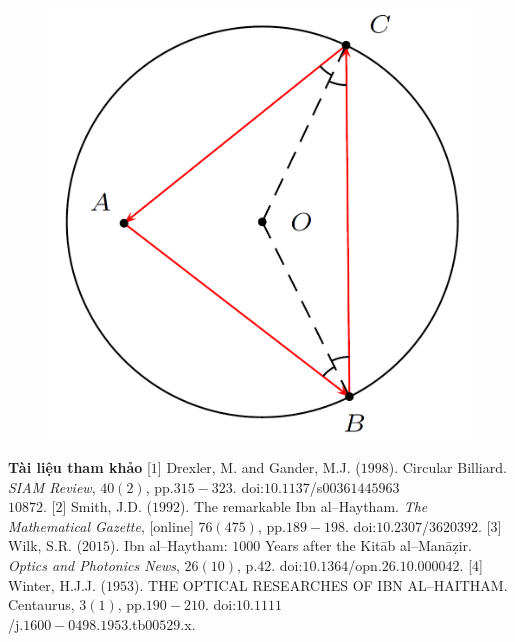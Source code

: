 \begin{multicols}{2}
	\begin{figure}[H]
		\vspace*{-5pt}
		\centering
		\captionsetup{labelformat= empty, justification=centering}
		\includegraphics[width= 0.75\linewidth]{18}
		\vspace*{-10pt}
	\end{figure}
	\vskip 0.1cm
	\textbf{\color{lichsutoanhoc}Tài liệu tham khảo}
	\vskip 0.1cm
	[$1$] Drexler, M. and Gander, M.J. ($1998$). Circular Billiard. \textit{SIAM Review}, $40(2)$, pp.$315-323$. doi:$10.1137$/s$00361445963$\\$10872$.
	\vskip 0.1cm
	[$2$] Smith, J.D. ($1992$). The remarkable Ibn al--Haytham. \textit{The Mathematical Gazette}, [online] $76(475)$, pp.$189-198$. doi:$10.2307$/$3620392$.
	\vskip 0.1cm
	[$3$] Wilk, S.R. ($2015$). Ibn al--Haytham: $1000$ Years after the Kitāb al--Manāẓir. \textit{Optics and Photonics News}, $26(10)$, p.$42$. doi:$10.1364$/opn.$26.10.000042$.
	\vskip 0.1cm
	[$4$] Winter, H.J.J. ($1953$). THE OPTICAL RESEARCHES OF IBN AL--HAITHAM. Centaurus, $3(1)$, pp.$190-210$. doi:$10.1111$\\/j.$1600-0498$.$1953$.tb$00529$.x.
\end{multicols}